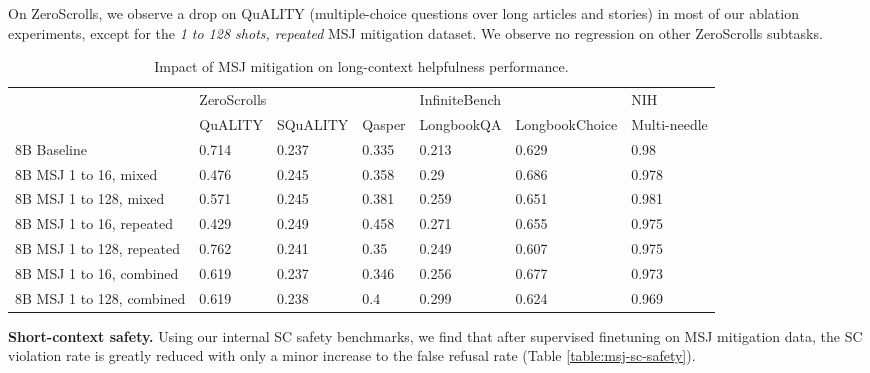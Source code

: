 On ZeroScrolls, we observe a drop on QuALITY (multiple-choice questions over long articles and stories) in most of our ablation experiments, except for the \textit{1 to 128 shots, repeated }MSJ mitigation dataset. We observe no regression on other ZeroScrolls subtasks.


\begin{table}[]
\begin{tabular}{@{}lllllll@{}}
\toprule
                                & \multicolumn{3}{l}{ZeroScrolls} & \multicolumn{2}{l}{InfiniteBench} & NIH          \\
                                & QuALITY  & SQuALITY  & Qasper  & LongbookQA    & LongbookChoice    & Multi-needle \\ \midrule
8B Baseline                     & 0.714     & 0.237     & 0.335   & 0.213         & 0.629             & 0.98         \\
8B MSJ 1 to 16, mixed     & 0.476     & 0.245     & 0.358   & 0.29          & 0.686             & 0.978        \\
8B MSJ 1 to 128, mixed    & 0.571     & 0.245     & 0.381   & 0.259              & 0.651                  & 0.981        \\
8B MSJ 1 to 16, repeated  & 0.429     & 0.249     & 0.458   & 0.271         & 0.655             & 0.975        \\
8B MSJ 1 to 128, repeated & 0.762     & 0.241     & 0.35    & 0.249         & 0.607             & 0.975        \\
8B MSJ 1 to 16, combined  & 0.619     & 0.237     & 0.346   & 0.256         & 0.677             & 0.973        \\
8B MSJ 1 to 128, combined & 0.619     & 0.238     & 0.4     & 0.299         & 0.624             & 0.969        \\ \bottomrule
\end{tabular}
\caption{Impact of MSJ mitigation on long-context helpfulness performance. \label{table:msj-lc-helpfulness}}
\end{table}

\textbf{Short-context safety.}
Using our internal SC safety benchmarks, we find that after supervised finetuning on MSJ mitigation data, the SC violation rate is greatly reduced with only a minor increase to the false refusal rate (Table \ref{table:msj-sc-safety}).





